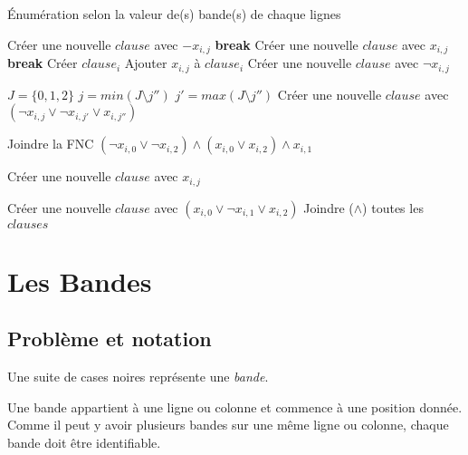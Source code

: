 \documentclass[a4paper,12pt]{report}
\begin{document}
\begin{algorithm}
\caption{Énumération selon la valeur de(s) bande(s) de chaque lignes}
\begin{algorithmic}
		 
				\State Créer une nouvelle $clause$ avec $-x_{i,j}$
				\State \textbf{break}
				\State Créer une nouvelle $clause$ avec $x_{i,j}$
				\State \textbf{break}
			\EndIf
		\EndFor
		 
				\State Créer $clause_i$
			\EndIf
			Ajouter $x_{i,j}$ à $clause_i$ 
		\EndFor
			 
					\State	Créer une nouvelle $clause$ avec $\lnot x_{i,j} $
				\EndFor
	
			 
			\State $J=\{0,1,2\}$
					\State $j=min(J\setminus j'')$
					\State $j'=max(J\setminus j'')$ 
					\State Créer une nouvelle $clause$ avec $(\lnot x_{i,j}\vee \lnot x_{i,j'} \vee x_{i,j''} )$ 
				\EndFor
							
			 
				\State Joindre la FNC $(\lnot x_{i,0} \vee \lnot x_{i,2}) \wedge (x_{i,0} \vee x_{i,2}) \wedge x_{i,1}$
							
			 
							\State Créer une nouvelle $clause$ avec $x_{i,j}$
				\EndFor
							
			\EndIf
			\State Créer une nouvelle $clause$ avec $(x_{i,0} \vee \lnot x_{i,1} \vee x_{i,2})$
		\EndIf			 
		\State Joindre ($\wedge$) toutes les $clauses$
\EndFor
\end{algorithmic}
\end{algorithm}


\chapter{Les Bandes}
\section{Problème et notation}

Une suite de cases noires représente une \textit{bande}. 

Une bande appartient à une ligne ou colonne et commence à une position donnée. Comme il peut y avoir plusieurs bandes sur une même ligne ou colonne, chaque bande doit être identifiable.\\
\end{document}
